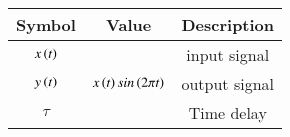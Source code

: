 \begin{tabular}{|c|c|c|}
   \hline
   \textbf{Symbol} & \textbf{Value}& \textbf{Description} \\
   \hline
         $x\left(t\right)$ & & input signal\\
        \hline
        $y\left(t\right)$ &$x\left(t\right)sin\left(2\pi t\right)$  & output signal\\
        \hline
        $\tau$ &   & Time delay\\
        \hline
\end{tabular}

